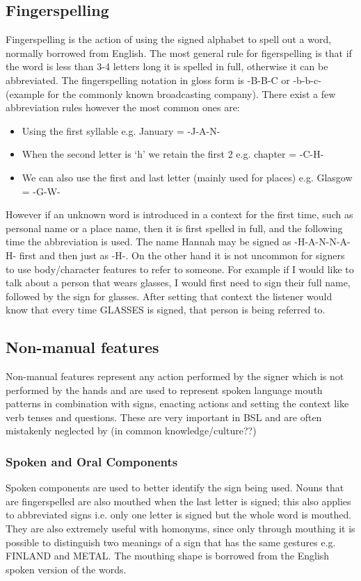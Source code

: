 \documentclass[12pt]{ociamthesis}  %
\begin{document}
\subsection{Fingerspelling}
Fingerspelling is the action of using the signed alphabet to spell out a word, normally borrowed from English. The most general rule for figerspelling is that if the word is less than 3-4 letters long it is spelled in full, otherwise it can be abbreviated. The fingerspelling notation in gloss form is -B-B-C or -b-b-c- (example for the commonly known broadcasting company). There exist a few abbreviation rules however the most common ones are:
\begin{itemize}
	\item Using the first syllable e.g. January = -J-A-N-
	\item When the second letter is `h' we retain the first 2 e.g. chapter = -C-H-
	\item We can also use the first and last letter (mainly used for places) e.g. Glasgow = -G-W-
\end{itemize}
However if an unknown word is introduced in a context for the first time, such as personal name or a place name, then it is first spelled in full, and the following time the abbreviation is used. The name Hannah may be signed as -H-A-N-N-A-H- first and then just as -H-. On the other hand it is not uncommon for signers to use body/character features to refer to someone. For example if I would like to talk about a person that wears glasses, I would first need to sign their full name, followed by the sign for glasses. After setting that context the listener would know that every time GLASSES is signed, that person is being referred to.

\subsection{Non-manual features}
\label{non-man}
Non-manual features represent any action performed by the signer which is not performed by the hands and are used to represent spoken language mouth patterns in combination with signs, enacting actions and setting the context like verb tenses and questions. These are very important in BSL and are often mistakenly neglected by (in common knowledge/culture??)
\subsubsection{Spoken and Oral Components}
\label{so-components}
Spoken components are used to better identify the sign being used. Nouns that are fingerspelled are also mouthed when the last letter is signed; this also applies to abbreviated signs i.e. only one letter is signed but the whole word is mouthed. They are also extremely useful with homonyms, since only through mouthing it is possible to distinguish two meanings of a sign that has the same gestures e.g. FINLAND and METAL. The mouthing shape is borrowed from the English spoken version of the words.
\end{document}
